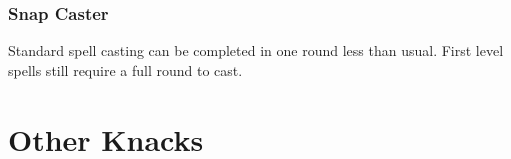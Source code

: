 \begin{multicols}{2}
\subsubsection{Snap Caster}

\iftoggle{verbose}{
	The character is particularly adept at casting spells quickly, and therefore in Combat.
	\Glspl{miracleworker} with this knack spend only 2 Initiative + the spell's level when casting \textit{Fast} spells.
}{
	\textit{Fast} spells cost 2 + their level in Initiative to cast.
}
Standard spell casting can be completed in one round less than usual.
\iftoggle{verbose}{%
	So a third level spell can be cast in only two \glspl{round}.
}{}%
First level spells still require a full round to cast.

\end{multicols}

\section{Other Knacks}

